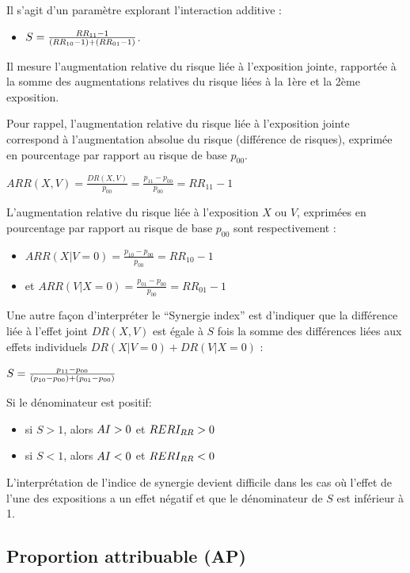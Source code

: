 \documentclass[
]{book}
\providecommand{\tightlist}{%
  \setlength{\itemsep}{0pt}\setlength{\parskip}{0pt}}
\begin{document}
Il s'agit d'un paramètre explorant l'interaction additive :

\begin{itemize}
\tightlist
\item
  \(\small S = \frac{RR_{11} - 1}{(RR_{10} - 1) + (RR_{01}-1)}\).
\end{itemize}

Il mesure l'augmentation relative du risque liée à l'exposition jointe, rapportée à la somme des augmentations relatives du risque liées à la 1ère et la 2ème exposition.

Pour rappel, l'augmentation relative du risque liée à l'exposition jointe correspond à l'augmentation absolue du risque (différence de risques), exprimée en pourcentage par rapport au risque de base \(p_{00}\).

\(ARR(X,V) = \frac{DR(X,V)}{p_{00}} = \frac{p_{11}-p_{00}}{p_{00}}= RR_{11}-1\)

L'augmentation relative du risque liée à l'exposition \(X\) ou \(V\), exprimées en pourcentage par rapport au risque de base \(p_{00}\) sont respectivement :

\begin{itemize}
\tightlist
\item
  \(ARR(X|V=0) = \frac{p_{10}-p_{00}}{p_{00}}= RR_{10}-1\)
\item
  et \(ARR(V|X=0) = \frac{p_{01}-p_{00}}{p_{00}}= RR_{01}-1\)
\end{itemize}

Une autre façon d'interpréter le ``Synergie index'' est d'indiquer que la différence liée à l'effet joint \(DR(X,V)\) est égale à \(S\) fois la somme des différences liées aux effets individuels \(DR(X|V=0) + DR(V|X=0)\) :

\(\small S = \frac{p_{11}-p_{00}}{(p_{10}-p_{00}) + (p_{01} - p_{00})}\)

Si le dénominateur est positif:

\begin{itemize}
\tightlist
\item
  si \(S > 1\), alors \(\small AI > 0\) et \(\small RERI_{RR} > 0\)
\item
  si \(S < 1\), alors \(\small AI < 0\) et \(\small RERI_{RR} < 0\)
\end{itemize}

L'interprétation de l'indice de synergie devient difficile dans les cas où l'effet de l'une des expositions a un effet négatif et que le dénominateur de \(S\) est inférieur à 1.

\hypertarget{proportion-attribuable-ap}{%
\subsection{Proportion attribuable (AP)}\label{proportion-attribuable-ap}}
\end{document}
